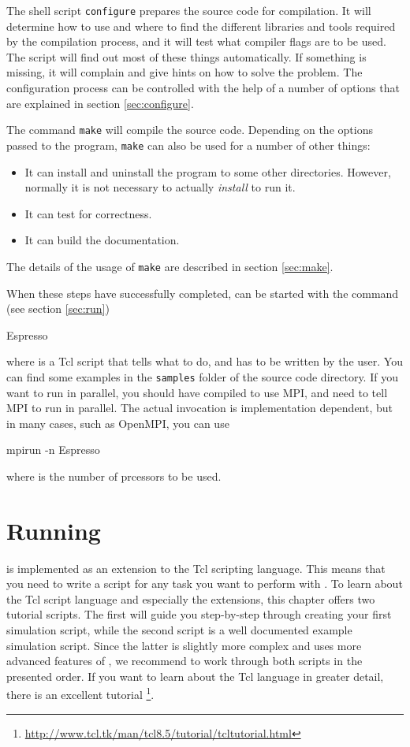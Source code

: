 The shell script \texttt{configure} prepares the source code for
compilation. It will determine how to use and where to find the
different libraries and tools required by the compilation process, and
it will test what compiler flags are to be used.  The script will find
out most of these things automatically.  If something is missing, it
will complain and give hints on how to solve the problem.  The
configuration process can be controlled with the help of a number of
options that are explained in section \vref{sec:configure}.

The command \texttt{make} will compile the source code. Depending on
the options passed to the program, \texttt{make} can also be used for
a number of other things:
\begin{itemize}
\item It can install and uninstall the program to some other
  directories. However, normally it is not necessary to actually
  \textit{install} \es to run it.
\item It can test \es for correctness.
\item It can build the documentation.
\end{itemize}
The details of the usage of \texttt{make} are described in section
\vref{sec:make}.

When these steps have successfully completed, \es can be started
with the command (see section \vref{sec:run})
\begin{code}
Espresso 
\end{code}
where  is a Tcl script that tells \es what to do, and
has to be written by the user. You can find some examples in the
\texttt{samples} folder of the source code directory.
If you want to run in parallel, you should have compiled \es to use
MPI, and need to tell MPI to run \es in parallel. The actual
invocation is implementation dependent, but in many cases, such as
OpenMPI, you can use
\begin{code}
mpirun -n  Espresso 
\end{code}
where  is the number of prcessors to be used.

\section{Running \es}

\es is implemented as an extension to the Tcl scripting language.
This means that you need to write a script for any task you want to
perform with \es. To learn about the Tcl script language and
especially the \es extensions, this chapter offers two tutorial
scripts. The first will guide you step-by-step through creating your
first simulation script, while the second script is a well documented
example simulation script. Since the latter is slightly more complex
and uses more advanced features of \es, we recommend to work through
both scripts in the presented order.  If you want to learn about the
Tcl language in greater detail, there is an excellent tutorial
\footnote{\url{http://www.tcl.tk/man/tcl8.5/tutorial/tcltutorial.html}}.

